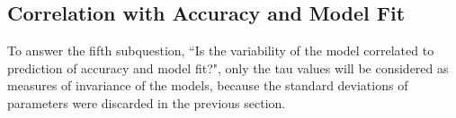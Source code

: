 \documentclass{scrartcl}
\begin{document}

\subsection{Correlation with Accuracy and Model Fit}
To answer the fifth subquestion, ``Is the variability of the model correlated to prediction of accuracy and model fit?", only the tau values will be considered as measures of invariance of the models, because the standard deviations of parameters were discarded in the previous section.
\end{document}
